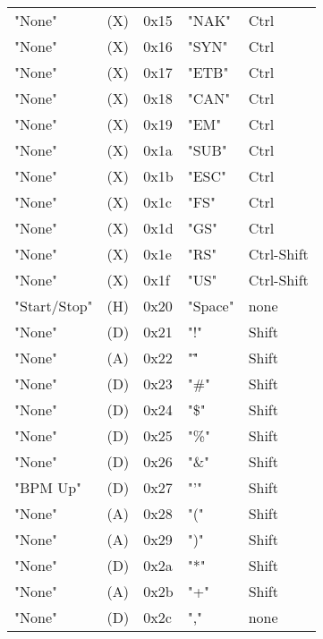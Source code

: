 \begin{table}[htb]
\begin{tabular}{l l l l l}
        "None"               & (X)  &  0x15   & "NAK"        & Ctrl \\
        "None"               & (X)  &  0x16   & "SYN"        & Ctrl \\
        "None"               & (X)  &  0x17   & "ETB"        & Ctrl \\
        "None"               & (X)  &  0x18   & "CAN"        & Ctrl \\
        "None"               & (X)  &  0x19   & "EM"         & Ctrl \\
        "None"               & (X)  &  0x1a   & "SUB"        & Ctrl \\
        "None"               & (X)  &  0x1b   & "ESC"        & Ctrl \\
        "None"               & (X)  &  0x1c   & "FS"         & Ctrl \\
        "None"               & (X)  &  0x1d   & "GS"         & Ctrl \\
        "None"               & (X)  &  0x1e   & "RS"         & Ctrl-Shift \\
        "None"               & (X)  &  0x1f   & "US"         & Ctrl-Shift \\
        "Start/Stop"         & (H)  &  0x20   & "Space"      & none \\
        "None"               & (D)  &  0x21   & "!"          & Shift \\
        "None"               & (A)  &  0x22   & "\""         & Shift \\
        "None"               & (D)  &  0x23   & "\#"         & Shift \\
        "None"               & (D)  &  0x24   & "\$"         & Shift \\
        "None"               & (D)  &  0x25   & "\%"         & Shift \\
        "None"               & (D)  &  0x26   & "\&"         & Shift \\
        "BPM Up"             & (D)  &  0x27   & "'"          & Shift \\
        "None"               & (A)  &  0x28   & "("          & Shift \\
        "None"               & (A)  &  0x29   & ")"          & Shift \\
        "None"               & (D)  &  0x2a   & "*"          & Shift \\
        "None"               & (A)  &  0x2b   & "+"          & Shift \\
        "None"               & (D)  &  0x2c   & ","          & none \\

\end{tabular}
\end{table}
